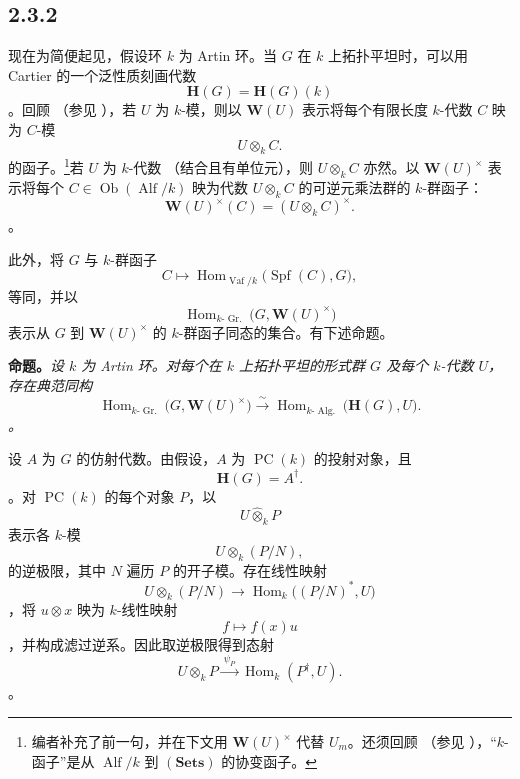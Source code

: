 
\subsection*{2.3.2}
\label{sga3:VIIB:2.3.2}

现在为简便起见，假设环 \(k\) 为 Artin 环。当 \(G\) 在 \(k\) 上拓扑平坦时，可以用 Cartier 的一个泛性质刻画代数 \[
  \mathbf H(G)=\mathbf H(G)(k)
\]。回顾 \textup{（参见 ）}，若 \(U\) 为 \(k\)-模，则以 \(\mathbf W(U)\) 表示将每个有限长度 \(k\)-代数 \(C\) 映为 \(C\)-模 \[
  U\otimes_k C.
\] 的函子。\footnote{\label{sga3:VIIB:nde:88}编者补充了前一句，并在下文用 \(\mathbf W(U)^\times\) 代替 \(U_m\)。还须回顾 \textup{（参见 ）}，“\(k\)-函子”是从 \(\operatorname{Alf}/k\) 到 \((\mathbf{Sets})\) 的协变函子。}若 \(U\) 为 \(k\)-代数 \textup{（结合且有单位元）}，则 \(U\otimes_k C\) 亦然。以 \(\mathbf W(U)^\times\) 表示将每个 \(C\in\operatorname{Ob}(\operatorname{Alf}/k)\) 映为代数 \(U\otimes_k C\) 的可逆元乘法群的 \(k\)-群函子：\[
  \mathbf W(U)^\times(C)=(U\otimes_k C)^\times.
\]。

此外，将 \(G\) 与 \(k\)-群函子 \[
  C\longmapsto
  \operatorname{Hom}_{\operatorname{Vaf}/k}
    \bigl(\operatorname{Spf}(C),G\bigr),
\] 等同，并以 \[
  \operatorname{Hom}_{k\text{-}\operatorname{Gr.}}
    \bigl(G,\mathbf W(U)^\times\bigr)
\] 表示从 \(G\) 到 \(\mathbf W(U)^\times\) 的 \(k\)-群函子同态的集合。有下述命题。

\medskip\noindent\textbf{命题。} \label{sga3:VIIB:2.3.2:prop}{\itshape 设 \(k\) 为 Artin 环。对每个在 \(k\) 上拓扑平坦的形式群 \(G\) 及每个 \(k\)-代数 \(U\)，存在典范同构 \[
  \operatorname{Hom}_{k\text{-}\operatorname{Gr.}}
    \bigl(G,\mathbf W(U)^\times\bigr)
  \xrightarrow{\ \sim\ }
  \operatorname{Hom}_{k\text{-}\operatorname{Alg.}}
    \bigl(\mathbf H(G),U\bigr).
\]。}

设 \(A\) 为 \(G\) 的仿射代数。由假设，\(A\) 为 \(\operatorname{PC}(k)\) 的投射对象，且 \[
  \mathbf H(G)=A^\dagger.
\]。对 \(\operatorname{PC}(k)\) 的每个对象 \(P\)，以 \[
  U\widehat\otimes_k P
\] 表示各 \(k\)-模 \[
  U\otimes_k(P/N),
\] 的逆极限，其中 \(N\) 遍历 \(P\) 的开子模。存在线性映射 \[
  U\otimes_k(P/N)
  \longrightarrow
  \operatorname{Hom}_k\bigl((P/N)^*,U\bigr)
\]，将 \(u\otimes x\) 映为 \(k\)-线性映射 \[
  f\longmapsto f(x)u
\]，并构成滤过逆系。因此取逆极限得到态射 \begin{equation}
  U\widehat\otimes_kP
  \xrightarrow{\ \psi_P\ }
  \operatorname{Hom}_k(P^\dagger,U).
  \tag{1}
  \label{sga3:VIIB:2.3.2:eq1}
\end{equation}。

